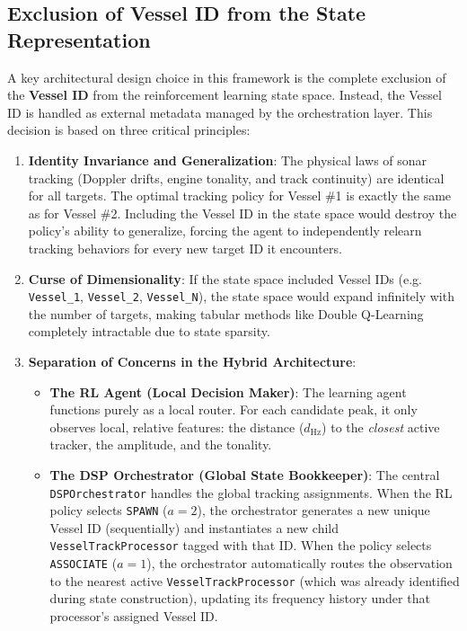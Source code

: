 \documentclass[12pt,a4paper]{article}
\begin{document}
\subsection{Exclusion of Vessel ID from the State Representation}
A key architectural design choice in this framework is the complete exclusion of the \textbf{Vessel ID} from the reinforcement learning state space. Instead, the Vessel ID is handled as external metadata managed by the orchestration layer. This decision is based on three critical principles:
\begin{enumerate}
    \item \textbf{Identity Invariance and Generalization}: The physical laws of sonar tracking (Doppler drifts, engine tonality, and track continuity) are identical for all targets. The optimal tracking policy for Vessel \#1 is exactly the same as for Vessel \#2. Including the Vessel ID in the state space would destroy the policy's ability to generalize, forcing the agent to independently relearn tracking behaviors for every new target ID it encounters.
    \item \textbf{Curse of Dimensionality}: If the state space included Vessel IDs (e.g. \texttt{Vessel\_1}, \texttt{Vessel\_2}, \texttt{Vessel\_N}), the state space would expand infinitely with the number of targets, making tabular methods like Double Q-Learning completely intractable due to state sparsity.
    \item \textbf{Separation of Concerns in the Hybrid Architecture}:
    \begin{itemize}
        \item \textbf{The RL Agent (Local Decision Maker)}: The learning agent functions purely as a local router. For each candidate peak, it only observes local, relative features: the distance ($d_{\text{Hz}}$) to the \textit{closest} active tracker, the amplitude, and the tonality.
        \item \textbf{The DSP Orchestrator (Global State Bookkeeper)}: The central \texttt{DSPOrchestrator} handles the global tracking assignments. When the RL policy selects \texttt{SPAWN} ($a = 2$), the orchestrator generates a new unique Vessel ID (sequentially) and instantiates a new child \texttt{VesselTrackProcessor} tagged with that ID. When the policy selects \texttt{ASSOCIATE} ($a = 1$), the orchestrator automatically routes the observation to the nearest active \texttt{VesselTrackProcessor} (which was already identified during state construction), updating its frequency history under that processor's assigned Vessel ID.
    \end{itemize}
\end{enumerate}
\end{document}
